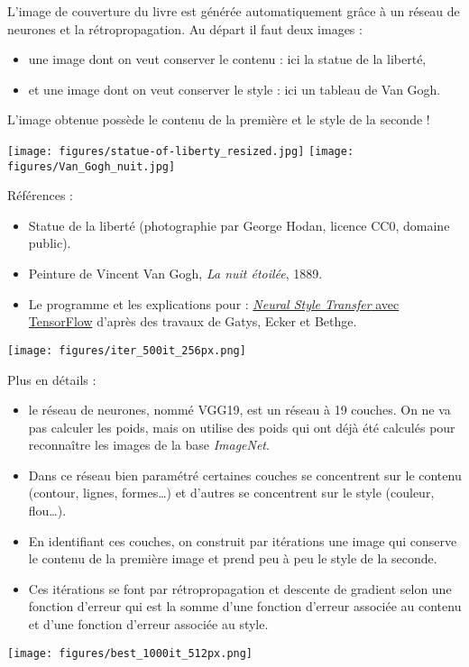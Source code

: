 \documentclass[11pt,class=report,crop=false]{standalone}
\begin{document}
L'image de couverture du livre est générée automatiquement grâce à un réseau de neurones et  la rétropropagation. Au départ il faut deux images :
\begin{itemize}
  \item une image dont on veut conserver le contenu :  ici la statue de la liberté,
  \item et une image dont on veut conserver le style : ici un tableau de Van Gogh.
\end{itemize}
L'image obtenue possède le contenu de la première et le style de la seconde !

\begin{center}
\texttt{[image: figures/statue-of-liberty\_resized.jpg]}
\qquad\qquad
\texttt{[image: figures/Van\_Gogh\_nuit.jpg]}
\end{center}

Références :
\begin{itemize}
  \item Statue de la liberté (photographie par George Hodan, licence CC0, domaine public).
  \item Peinture de Vincent Van Gogh, \emph{La nuit étoilée}, 1889.
  \item Le programme et les explications pour \tensorflow{} :  \href{https://github.com/tensorflow/models/blob/master/research/nst_blogpost/4_Neural_Style_Transfer_with_Eager_Execution.ipynb}{\emph{Neural Style Transfer} avec TensorFlow} d'après des travaux de Gatys, Ecker et Bethge.
\end{itemize}

\begin{center}
\texttt{[image: figures/iter\_500it\_256px.png]}
\end{center}



Plus en détails :
\begin{itemize}
  \item le réseau de neurones, nommé \og{}VGG19\fg{}, est un réseau à 19 couches. 
  On ne va pas calculer les poids, mais on utilise des poids qui ont déjà été calculés pour reconnaître les images de la base \emph{ImageNet}.
  
  \item Dans ce réseau bien paramétré certaines couches se concentrent sur le contenu (contour, lignes, formes\ldots) et d'autres se concentrent sur le style (couleur, flou\ldots).
  
  \item En identifiant ces couches, on construit par itérations une image qui conserve le contenu de la première image et prend peu à peu le style de la seconde.
  
  \item Ces itérations se font par rétropropagation et descente de gradient selon une fonction d'erreur qui est la somme d'une fonction d'erreur associée au contenu et d'une fonction d'erreur associée au style.
 
\end{itemize}


\begin{center}
\texttt{[image: figures/best\_1000it\_512px.png]}
\end{center}
\end{document}
